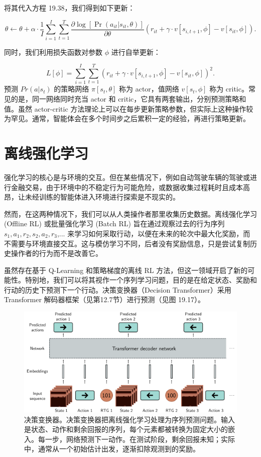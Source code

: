 将其代入方程 19.38，我们得到如下更新：

\begin{equation}
\theta \leftarrow \theta + \alpha \cdot \frac{1}{I} \sum_{i=1}^{I} \sum_{t=1}^{T} \frac{\partial \log[\Pr(a_{it}|s_{it}, \theta)]}{\partial \theta} (r_{it} + \gamma \cdot v[s_{i,t+1}, \phi] - v[s_{it}, \phi]). 
\end{equation}

同时，我们利用损失函数对参数 \(\phi\) 进行自举更新：

\begin{equation}
L[\phi] = \sum_{i=1}^{I} \sum_{t=1}^{T} \left( r_{it} + \gamma \cdot v[s_{i,t+1}, \phi] - v[s_{it}, \phi] \right)^2. 
\end{equation}
预测 \(Pr(a|s_t)\) 的策略网络 \(\pi[s_t,\theta]\) 称为 actor，值网络 \(v[s_t,\phi]\) 称为 critic。常见的是，同一网络同时充当 actor 和 critic，它具有两套输出，分别预测策略和值。虽然 actor-critic 方法理论上可以在每步更新策略参数，但实际上这种操作较为罕见。通常，智能体会在多个时间步之后累积一定的经验，再进行策略更新。

\section{离线强化学习}
强化学习的核心是与环境的交互。但在某些情况下，例如自动驾驶车辆的驾驶或进行金融交易，由于环境中的不稳定行为可能危险，或数据收集过程耗时且成本高昂，让未经训练的智能体进入环境进行探索是不现实的。

然而，在这两种情况下，我们可以从人类操作者那里收集历史数据。离线强化学习 (Offline RL) 或批量强化学习 (Batch RL) 旨在通过观察过去的行为序列 \(s_1,a_1,r_2,s_2,a_2,r_3\),... 来学习如何采取行动，以便在未来的轮次中最大化奖励，而不需要与环境直接交互。这与模仿学习不同，后者没有奖励信息，只是尝试复制历史操作者的行为而不是改善它。

虽然存在基于 Q-Learning 和策略梯度的离线 RL 方法，但这一领域开启了新的可能性。特别地，我们可以将其视作一个序列学习问题，目的是在给定状态、奖励和行动的历史下预测下一个行动。决策变换器（Decision Transformer）采用 Transformer 解码器框架（见第12.7节）进行预测（见图 19.17）。

\begin{figure}[ht!]
\centering
\includegraphics[width=0.7\linewidth]{png/chapter19/ReinforceDecisionTransformer.png}
\caption{决策变换器。决策变换器把离线强化学习处理为序列预测问题。输入是状态、动作和剩余回报的序列，每个元素都被转换为固定大小的嵌入。每一步，网络预测下一动作。在测试阶段，剩余回报未知；实际中，通常从一个初始估计出发，逐渐扣除观测到的奖励。}
\end{figure}

